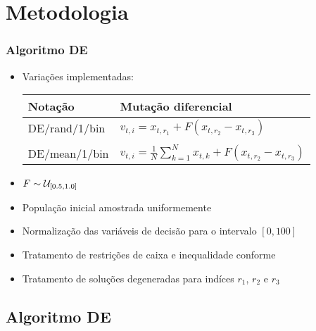 \documentclass{beamer}
\begin{document}
\section{Metodologia}

\begin{frame}
	\frametitle{Algoritmo DE}
	\begin{itemize}
		\item Variações implementadas: 
		\begin{table}
		\begin{tabular}{l | l}
			\toprule
			\textbf{Notação} & \textbf{Mutação diferencial}\\
			\midrule
			DE/rand/1/bin & $v_{t,i} = x_{t,r_1} + F(x_{t,r_2} - x_{t,r_3})$ \\ & \\
			DE/mean/1/bin & $v_{t,i} = \frac{1}{N}\sum_{k=1}^{N}x_{t,k} + F(x_{t,r_2} - x_{t,r_3}) $\\
			\bottomrule
		\end{tabular}
	\end{table}
		\item $\mathnormal{F} \sim \mathcal{U}_{[0.5,1.0]}$
		\item População inicial amostrada uniformemente
		\item Normalização das variáveis de decisão para o intervalo $[0,100]$
		\item Tratamento de restrições de caixa e inequalidade conforme \cite{lampinen2002}
		\item Tratamento de soluções degeneradas para indíces $r_1$, $r_2$ e $r_3$ \cite{gaspar2002}

	\end{itemize}
	
\end{frame}	

\subsection{Algoritmo DE}
\end{document}
